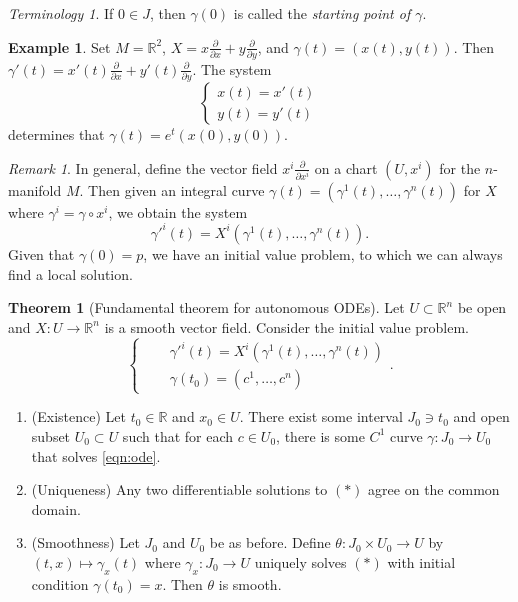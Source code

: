 \documentclass[10pt,letterpaper,cm]{nupset}
\theoremstyle{definition}
\newtheorem{exmp}[definition]{Example}
\theoremstyle{theorem}
\newtheorem{theorem}[definition]{Theorem}
\theoremstyle{remark}
\newtheorem{remark}[definition]{Remark}
\newtheorem*{term}{Terminology}
\newcommand{\R}{\mathbb R}
\newcommand{\1}{\mathbf{1}}
\newcommand{\0}{\vec 0}
\begin{document}
\begin{term}
If $0\in J$, then $\gamma(0)$ is called the \textit{starting point of $\gamma$}.
\end{term}

\begin{exmp}
Set $M= \R^2$, $X = x\frac{\partial}{\partial{x}} + y \frac{\partial}{\partial{y}}$, and $\gamma(t) = (x(t), y(t))$. Then $\gamma'(t) = x'(t)\frac{\partial}{\partial{x}}  + y'(t)\frac{\partial}{\partial{y}}$.  The system 
\[
\begin{cases} x(t) = x'(t) \\ y(t) = y'(t) \end{cases}
\] determines that 
$\gamma(t) = e^t(x(0), y(0))$.
\end{exmp}
\begin{remark}
In general, define the vector field $x^i\frac{\partial}{\partial{x^i}}$ on a chart $(U, x^i)$ for the $n$-manifold $M$. Then given an integral curve $\gamma(t) = \left(\gamma^1(t), \ldots, \gamma^n(t)\right)$ for $X$ where $\gamma^i = \gamma \circ x^i$, we obtain the system $$ \gamma'^i(t) = X^i\left(\gamma^1(t), \ldots, \gamma^n(t)\right).  $$ Given that $\gamma(0) =p$, we have an initial value problem, to which we can always find a local solution.
\end{remark}

\begin{theorem}[Fundamental theorem for autonomous ODEs]
Let $U\subset \R^n$ be open and $X: U \to \R^n$ is a smooth vector field.  Consider the initial value problem.
\begin{equation}
 \begin{cases}  \label{eqn:ode} 
 & \gamma'^i(t)  = X^i\left(\gamma^1(t), \ldots, \gamma^n(t)\right) \\ \quad  & \gamma(t_0)  =(c^1, \ldots, c^n) 
 \end{cases}.
\end{equation}
\begin{enumerate}
\item (Existence)  Let $t_0 \in \R$ and $x_0\in U$. There exist some interval $J_0 \ni t_0$ and open subset $U_0 \subset U$ such that for each $c\in U_0$, there is some $C^1$ curve $\gamma : J_0 \to U_0$ that solves  \cref{eqn:ode}.
\item (Uniqueness)  Any two differentiable solutions to $(\ast)$ agree on the common domain.
\item (Smoothness) Let $J_0$ and $U_0$ be as before. Define $\theta : J_0 \times U_0 \to U$ by $(t, x) \mapsto \gamma_x(t)$ where $\gamma_x : J_0 \to U$ uniquely solves $(\ast)$ with initial condition $\gamma(t_0) = x$. Then $\theta$ is smooth.
\end{enumerate}
\end{theorem}
\end{document}
